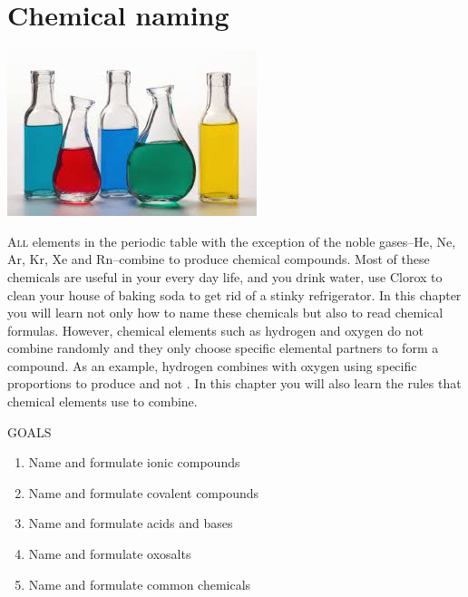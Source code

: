\documentclass[main.tex]{subfiles}
\begin{document}
\linenumbers


\chapter[Chemical naming ]{Chemical naming}
\label{ch:naming}

\begin{marginfigure}
      \includegraphics{chapter5/figure1}
   \end{marginfigure}
\lettrine[lines=4]{\color{black!45}A}{ll} elements in the periodic table with the exception of the noble gases--He, Ne, Ar, Kr, Xe and Rn--combine to produce chemical compounds. Most of these chemicals are useful in your every day life, and you drink water, use Clorox to clean your house of baking soda to get rid of a stinky refrigerator. In this chapter you will learn not only how to name these chemicals but also to read chemical formulas. However, chemical elements such as hydrogen and oxygen do not combine randomly and they only choose specific elemental partners to form a compound. As an example, hydrogen combines with oxygen using specific proportions to produce  and not . In this chapter you will also learn the rules that chemical elements use to combine.
\begin{marginfigure}%
\begin{mytcbox}{GOALS}
\begin{enumerate}[label=\protect\circled{\color{white}\arabic*}]
\item Name and formulate ionic compounds
\item Name and formulate covalent compounds
\item Name and formulate acids and bases 
\item Name and formulate oxosalts 
\item Name and formulate common chemicals
\end{enumerate}
\end{mytcbox}
\end{marginfigure}%
\end{document}

